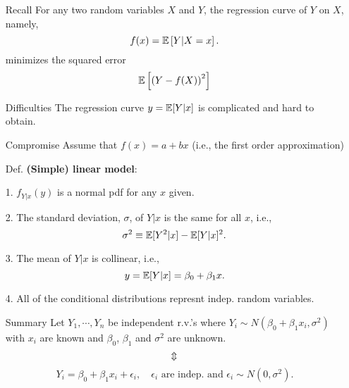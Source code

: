 \begin{frame}
	\phantom{a}\hfill
	\begin{minipage}{0.95\textwidth}
\begin{enumerate}[leftmargin=15em]
\item[Recall] For any two random variables $X$ and $Y$, the regression curve of $Y$ on $X$, namely,
\[
f(x) = \mathbb{E} \left[Y|X=x \right].
\]
minimizes the squared error
\[
\mathbb{E}\left[  \left(Y-f(X)\right)^2\right]
\]
\vspace{3em}
\item[Difficulties] The regression curve $y=\mathbb{E}[Y|x]$ is complicated and hard to obtain.
\vspace{3em}
\item[Compromise] Assume that $f(x)=a+bx$ \quad (i.e., the first order approximation)
\end{enumerate}
	\end{minipage}
\end{frame}
\begin{frame}
\begin{enumerate}
	\item[Def.] \textcolor{yellow!80!black}{\bf (Simple) linear model}:
	\item[] 1. $f_{Y|x}(y)$ is a normal pdf for any $x$ given.
	\vfill
	\item[] 2. The standard deviation, $\sigma$, of $Y|x$ is the same for all $x$, i.e.,
	\[
	\sigma^2 \equiv \mathbb{E}[Y^2|x] - \mathbb{E}[Y|x]^2.
	\]
	\vfill
	\item[] 3. The mean of $Y|x$ is collinear, i.e.,
	\[
	y = \mathbb{E}[Y|x] = \beta_0 + \beta_1 x.
	\]
	\item[] 4. All of the conditional distributions represnt indep. random variables.
		\vfill
	\item[Summary] Let $Y_1,\cdots,Y_n$ be independent r.v.'s where $Y_i\sim N(\beta_0+\beta_1x_i,\sigma^2)$ with $x_i$ are known and $\beta_0$, $\beta_1$ and $\sigma^2$ are unknown.
		\[\text{\rotatebox[origin=c]{90}{$\Leftrightarrow$}}\]
		\[
			Y_i = \beta_0+\beta_1 x_i + \epsilon_i, \quad \text{$\epsilon_i$ are indep. and $\epsilon_i\sim N(0,\sigma^2)$}.
		\]
\end{enumerate}
\end{frame}
